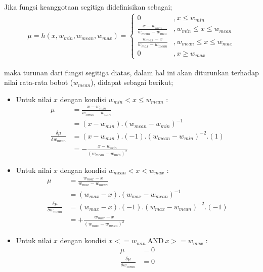 \noindent Jika fungsi keanggotaan segitiga didefinisikan sebagai;
\begin{align}
\label{eq:trim}
	\mu = h(x, w_{min}, w_{mean}, w_{max}) = \left\{ 
	\begin{array}{ll}
	0 & , x \leq w_{min}\\
	\frac{x - w_{min}}{w_{mean} - w_{min}} & , w_{min} \leq x \leq w_{mean} \\
	\frac{w_{max} - x}{w_{max} - w_{mean}} & , w_{mean} \leq x \leq w_{max} \\
	0 & , x \geq w_{max}
	\end{array}
\end{align}

\noindent maka turunan dari fungsi segitiga diatas, dalam hal ini akan
diturunkan terhadap nilai rata-rata bobot ($w_{mean}$), didapat sebagai berikut;
\begin{itemize}
  \item Untuk nilai $x$ dengan kondisi $w_{min} < x \leq w_{mean}$ :
  \begin{align}
	\label{eq:trim1}
		\mu &= \frac{x - w_{min}}{w_{mean} - w_{min}} \nonumber \\
			&= (x - w_{min}) . (w_{mean} - w_{min})^{-1} \nonumber \\
		\frac{\delta \mu}{\delta w_{mean}} &=
		(x - w_{min}).(-1).(w_{mean} - w_{min})^{-2}.(1) \nonumber \\
		 &=
		- \frac{x - w_{min}}{(w_{mean} - w_{min})^2}
	\end{align}

	\item Untuk nilai $x$ dengan kondisi  $w_{mean} < x < w_{max}$ :
	\begin{align}
	\label{eq:trim2}
		\mu &= \frac{w_{max} - x}{w_{max} - w_{mean}} \nonumber \\
			&= (w_{max} - x) . (w_{max} - w_{mean})^{-1} \nonumber \\
		\frac{\delta \mu}{\delta w_{mean}} &=
		(w_{max} - x).(-1).(w_{max} - w_{mean})^{-2}.(-1) \nonumber \\
		 &=
		+ \frac{w_{max} - x}{(w_{max} - w_{mean})^2}
	\end{align}
	
	\item Untuk nilai $x$ dengan kondisi $x <= w_{min}\ \text{AND}\ x >= w_{max}$ :
	\begin{align}
	\label{eq:trim3}
		\mu &= 0 \nonumber \\
		\frac{\delta \mu}{\delta w_{mean}} &= 0
	\end{align}
\end{itemize}

